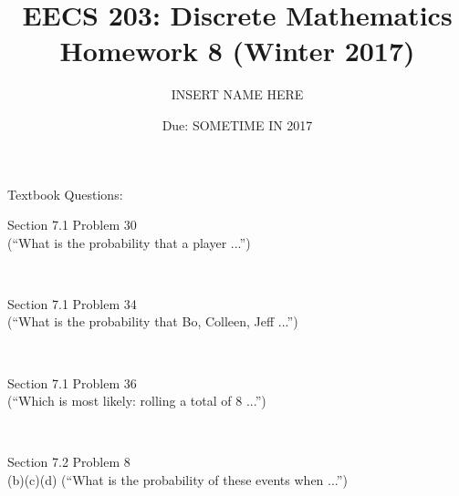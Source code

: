 \documentclass[11pt]{exam}
\begin{document}
\title{ EECS 203: Discrete Mathematics \\
        Homework 8 (Winter 2017)}
\date{Due: SOMETIME IN 2017}
\author{INSERT NAME HERE}

\maketitle

\begin{questions}

{\bf \item[] Textbook Questions:}

\question[2] Section 7.1 Problem 30\\
(“What is the probability that a player ...”) 
\begin{solution}\\



\end{solution}
\question[4] Section 7.1 Problem 34\\
(“What is the probability that Bo, Colleen, Jeff ...”) 
\begin{solution}\\



\end{solution}
\question[2] Section 7.1 Problem 36\\
(“Which is most likely: rolling a total of 8 ...”) 
\begin{solution}\\



\end{solution}
\question[6] Section 7.2 Problem 8\\
(b)(c)(d) (“What is the probability of these events when ...”) 
\begin{solution}\\




\end{solution}
\end{questions}
\end{document}
